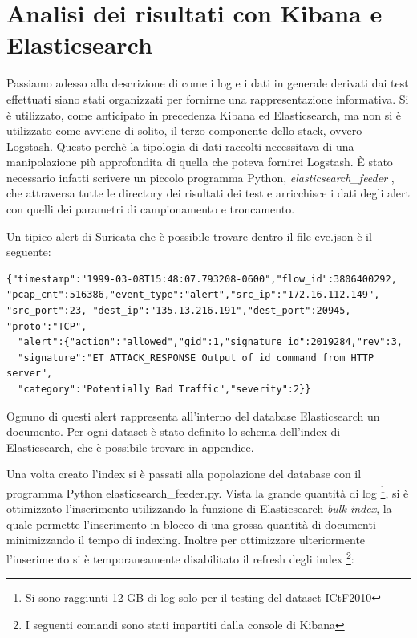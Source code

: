 \documentclass[12pt,a4paper,openright,twoside]{report}
\begin{document}
\section{Analisi dei risultati con Kibana e Elasticsearch}

Passiamo adesso alla descrizione di come i log e i dati in generale derivati dai
test effettuati siano stati organizzati per fornirne una rappresentazione informativa.
Si \`e utilizzato, come anticipato in precedenza Kibana ed Elasticsearch, ma non si
\`e utilizzato come avviene di solito, il terzo componente dello stack, ovvero Logstash.
Questo perch\`e la tipologia di dati raccolti necessitava di una manipolazione pi\`u approfondita di
quella che poteva fornirci Logstash. \`E stato necessario infatti scrivere un piccolo programma
Python, {\it elasticsearch\_feeder }, che attraversa tutte le directory dei risultati dei test e arricchisce i dati degli
alert con quelli dei parametri di campionamento e troncamento.

Un tipico alert di Suricata che \`e possibile trovare dentro il file eve.json \`e il
seguente:
\begin{verbatim}
{"timestamp":"1999-03-08T15:48:07.793208-0600","flow_id":3806400292,
"pcap_cnt":516386,"event_type":"alert","src_ip":"172.16.112.149",
"src_port":23, "dest_ip":"135.13.216.191","dest_port":20945,
"proto":"TCP",
  "alert":{"action":"allowed","gid":1,"signature_id":2019284,"rev":3,
  "signature":"ET ATTACK_RESPONSE Output of id command from HTTP server",
  "category":"Potentially Bad Traffic","severity":2}}
\end{verbatim}

Ognuno di questi alert rappresenta all'interno del database Elasticsearch un
documento.
Per ogni dataset \`e stato definito lo schema dell'index di Elasticsearch, che \`e
possibile trovare in appendice.

Una volta creato l'index si \`e passati alla popolazione del database con
il programma Python elasticsearch\_feeder.py.
Vista la grande quantit\`a di log \footnote{Si sono raggiunti 12 GB di log solo per il
testing del dataset ICtF2010}, si \`e ottimizzato l'inserimento utilizzando la
funzione di Elasticsearch {\it bulk index}, la quale permette l'inserimento in blocco
di una grossa quantit\`a di documenti minimizzando il tempo di indexing. Inoltre
per ottimizzare ulteriormente l'inserimento si \`e temporaneamente disabilitato il refresh degli index \cite{EXP8} \cite{EXP9}
\footnote{I seguenti comandi sono stati impartiti dalla console di Kibana}:
\end{document}
